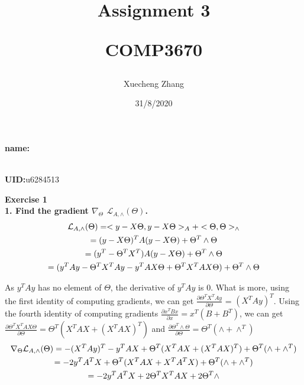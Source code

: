 \documentclass{article}
\title{Assignment  3\\ \vspace{0.2cm}

		COMP3670
}
\begin{document}
\setlength\parindent{0pt}
\maketitle
\vspace*{\fill}
    \begin{center}
    
        \textbf{name:}\author{Xuecheng Zhang}
        \\
        \textbf{UID:}u6284513
        
        \vspace{1.8cm}
        
        \date{31/8/2020}
    
    \end{center}
\vspace*{\fill}

\newpage

\textbf{Exercise 1}\\

\textbf{1. Find the gradient $\nabla_\Theta$ $\mathcal{L}_{A,\wedge}(\Theta)$.}\\
\begin{gather}
\mathcal{L}_{A,\wedge}(\Theta) = <y-X\Theta,y-X\Theta>_A + <\Theta,\Theta>_\wedge \notag\\
= (y-X\Theta)^T A (y-X\Theta) + \Theta^T \wedge \Theta \notag \\
= (y^T - \Theta^T X^T )A(y-X\Theta) +  \Theta^T \wedge \Theta \notag \\
= (y^TAy - \Theta^T X^TAy - y^TAX\Theta + \Theta^T X^T A X \Theta) + \Theta^T \wedge \Theta 
\end{gather}

As $y^TAy$ has no element of $\Theta$, the derivative of $y^TAy$ is 0. What is more, using the first identity of computing gradients, we can get $\frac{\partial \Theta^T X^T A y}{\partial \Theta}$ = $(X^TAy)^T$. Using the fourth identity of computing gradients $\frac{\partial x^TBx}{\partial x}= x^T(B+B^T)$, we can get $\frac{\partial  \Theta^T X^T A X \Theta}{\partial \Theta} = \Theta^T(X^T A X + (X^T A X)^T )$ and $\frac{\partial  \Theta^T \wedge \Theta}{\partial \Theta} = \Theta^T (\wedge + \wedge^T )$
\begin{gather}
\nabla_\Theta \mathcal{L}_{A,\wedge}(\Theta) = -(X^TAy)^T - y^TAX + \Theta^T(X^T A X + (X^T A X)^T ) + \Theta^T (\wedge + \wedge^T )\notag \\
= - 2y^TA^TX + \Theta^T(X^T A X + X^T A^T X) + \Theta^T (\wedge + \wedge^T ) \notag \\
= - 2y^TA^TX + 2\Theta^T X^T A X + 2\Theta^T \wedge
\end{gather}
 
\end{document}
